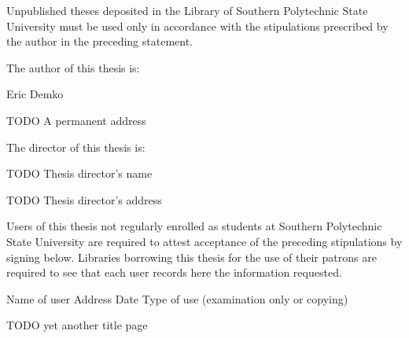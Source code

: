\documentclass[11pt]{article}
\begin{document}
Unpublished theses deposited in the Library of Southern Polytechnic State University must be used only in accordance with the stipulations prescribed by the author in the preceding statement.

The author of this thesis is:

{\centering
Eric Demko\par
TODO A permanent address\par}

The director of this thesis is:

{\centering
TODO Thesis director's name\par
TODO Thesis director's address\par}

Users of this thesis not regularly enrolled as students at Southern Polytechnic State University are required to attest acceptance of the preceding stipulations by signing below. Libraries borrowing this thesis for the use of their patrons are required to see that each user records here the information requested.

Name of user\hskip 0.3in
Address\hskip 0.5in
Date\hskip 0.3in
Type of use (examination only or copying)

\newpage
TODO yet another title page
\end{document}
